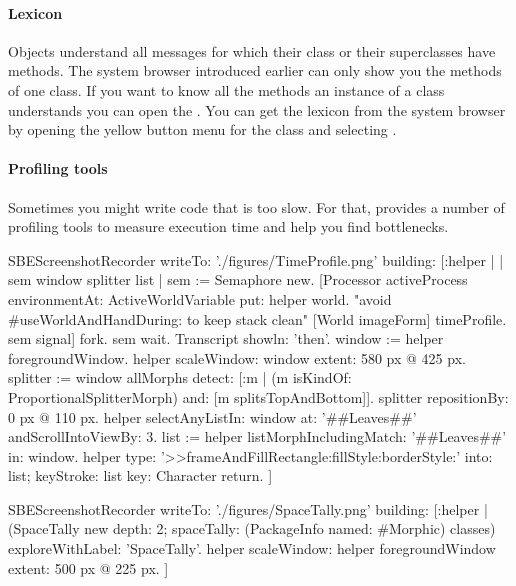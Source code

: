 \documentclass[a4paper,10pt,twoside]{book}
\begin{document}
\paragraph{Lexicon}
Objects understand all messages for which their class or their superclasses have methods.
The system browser introduced earlier can only show you the methods of one class.
If you want to know all the methods an instance of a class understands you can open the .
You can get the lexicon from the system browser by opening the yellow button menu for the class and selecting .

\paragraph{Profiling tools}
Sometimes you might write code that is too slow.
For that, \sq provides a number of profiling tools to measure execution time and help you find bottlenecks.

\begin{ExecuteSmalltalkScript}
SBEScreenshotRecorder writeTo: './figures/TimeProfile.png' building: [:helper |
	| sem window splitter list |
	sem := Semaphore new.
	[Processor activeProcess environmentAt: ActiveWorldVariable put: helper world. "avoid #useWorldAndHandDuring: to keep stack clean"
	[World imageForm] timeProfile.
	sem signal] fork.
	sem wait.
	Transcript showln: 'then'.
	window := helper foregroundWindow.
	helper scaleWindow: window extent: 580 px @ 425 px.
	splitter := window allMorphs detect: [:m |
	(m isKindOf: ProportionalSplitterMorph) and: [m splitsTopAndBottom]].
	splitter repositionBy: 0 px @ 110 px.
	helper selectAnyListIn: window at: '##Leaves##' andScrollIntoViewBy: 3.
	list := helper listMorphIncludingMatch: '##Leaves##' in: window.
	helper
		type: '>>frameAndFillRectangle:fillStyle:borderStyle:' into: list;
		keyStroke: list key: Character return.
]
\end{ExecuteSmalltalkScript}
\begin{ExecuteSmalltalkScript}
SBEScreenshotRecorder writeTo: './figures/SpaceTally.png' building: [:helper |
	(SpaceTally new depth: 2; spaceTally: (PackageInfo named: #Morphic) classes) exploreWithLabel: 'SpaceTally'.
	helper scaleWindow: helper foregroundWindow extent: 500 px @ 225 px.
]
\end{ExecuteSmalltalkScript}
\end{document}
